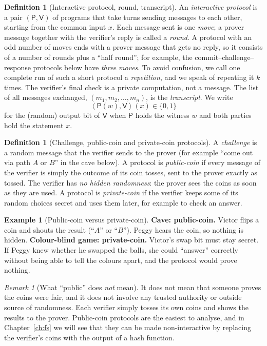\documentclass[11pt,a4paper]{report}
\theoremstyle{plain}
\theoremstyle{definition}
\newtheorem{definition}[theorem]{Definition}
\newtheorem{example}[theorem]{Example}
\theoremstyle{remark}
\newtheorem{remark}[theorem]{Remark}
\newcommand{\Prv}{\mathsf{P}}\newcommand{\Ver}{\mathsf{V}}
\newcommand{\pair}[2]{\left\langle #1,#2\right\rangle}
\begin{document}
\begin{definition}[Interactive protocol, round, transcript]\label{def:intro-protocol}
An \emph{interactive protocol} is a pair $(\Prv,\Ver)$ of programs that take turns sending messages to each other, starting from the common input $x$. Each message sent is one \emph{move}; a prover message together with the verifier's reply is called a \emph{round}. A protocol with an odd number of moves ends with a prover message that gets no reply, so it consists of a number of rounds plus a ``half round''; for example, the commit--challenge--response protocols below have \emph{three moves}. To avoid confusion, we call one complete run of such a short protocol a \emph{repetition}, and we speak of repeating it $k$ times. The verifier's final check is a private computation, not a message. The list of all messages exchanged, $(m_1,m_2,\dots,m_n)$, is the \emph{transcript}. We write
\[
 \pair{\Prv(w)}{\Ver}(x)\in\{0,1\}
\]
for the (random) output bit of $\Ver$ when $\Prv$ holds the witness $w$ and both parties hold the statement $x$.
\end{definition}

\begin{definition}[Challenge, public-coin and private-coin protocols]\label{def:intro-publiccoin}
A \emph{challenge} is a random message that the verifier sends to the prover (for example ``come out via path $A$ or $B$'' in the cave below).
A protocol is \emph{public-coin} if every message of the verifier is simply the outcome of its coin tosses, sent to the prover exactly as tossed. The verifier has \emph{no hidden randomness}: the prover sees the coins as soon as they are used.
A protocol is \emph{private-coin} if the verifier keeps some of its random choices secret and uses them later, for example to check an answer.
\end{definition}

\begin{example}[Public-coin versus private-coin]
\textbf{Cave: public-coin.} Victor flips a coin and shouts the result (``$A$'' or ``$B$''). Peggy hears the coin, so nothing is hidden.
\textbf{Colour-blind game: private-coin.} Victor's swap bit must stay secret. If Peggy knew whether he swapped the balls, she could ``answer'' correctly without being able to tell the colours apart, and the protocol would prove nothing.
\end{example}

\begin{remark}[What ``public'' does \emph{not} mean]
It does not mean that someone proves the coins were fair, and it does not involve any trusted authority or outside source of randomness. Each verifier simply tosses its own coins and shows the results to the prover. Public-coin protocols are the easiest to analyse, and in Chapter~\ref{ch:fs} we will see that they can be made non-interactive by replacing the verifier's coins with the output of a hash function.
\end{remark}
\end{document}
